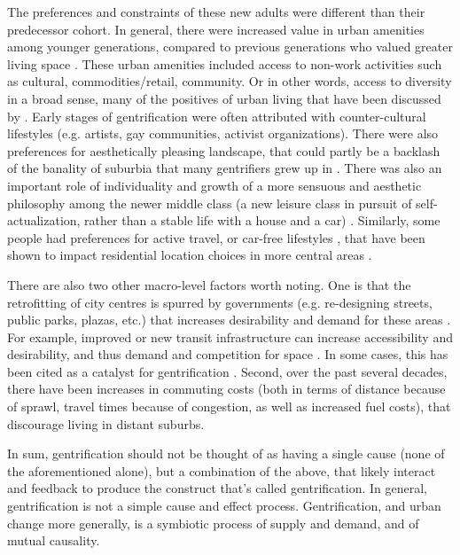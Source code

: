 The preferences and constraints of these new adults were different than their predecessor cohort. In general, there were increased value in urban amenities among younger generations, compared to previous generations who valued greater living space \cite{ley_alternative_1986,bourne_are_1989}. These urban amenities included access to non-work activities such as cultural, commodities/retail, community. Or in other words, access to diversity in a broad sense, many of the positives of urban living that have been discussed by . Early stages of gentrification were often attributed with counter-cultural lifestyles (e.g. artists, gay communities, activist organizations). There were also preferences for aesthetically pleasing landscape, that could partly be a backlash of the banality of suburbia that many gentrifiers grew up in \cite{hamnett_blind_1991,kunstler_geography_1994}. There was also an important role of individuality and growth of a more sensuous and aesthetic philosophy among the newer middle class (a new leisure class in pursuit of self-actualization, rather than a stable life with a house and a car) \cite{hamnett_blind_1991}. Similarly, some people had preferences for active travel, or car-free lifestyles \cite{schwanen_what_2005}, that have been shown to impact residential location choices in more central areas \cite{cao_how_2016}. 

There are also two other macro-level factors worth noting. One is that the retrofitting of city centres is spurred by governments (e.g. re-designing streets, public parks, plazas, etc.) that increases desirability and demand for these areas \cite{jones_transit-oriented_2016,zuk_gentrification_2018}. For example, improved or new transit infrastructure can increase accessibility and desirability, and thus demand and competition for space \cite{higgins_forty_2016}. In some cases, this has been cited as a catalyst for gentrification \cite{jones_transit-oriented_2016,padeiro_transit-oriented_2019,grube-cavers_urban_2015}. Second, over the past several decades, there have been increases in commuting costs (both in terms of distance because of sprawl, travel times because of congestion, as well as increased fuel costs), that discourage living in distant suburbs.

In sum, gentrification should not be thought of as having a single cause (none of the aforementioned alone), but a combination of the above, that likely interact and feedback to produce the construct that's called gentrification. In general, gentrification is not a simple cause and effect process. Gentrification, and urban change more generally, is a symbiotic process of supply and demand, and of mutual causality. 

